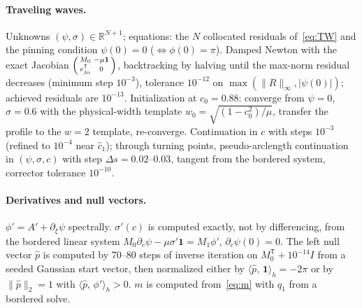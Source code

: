 \documentclass[11pt]{article}
\theoremstyle{plain}
\theoremstyle{definition}
\theoremstyle{remark}
\newcommand{\ip}[2]{\langle #1,\,#2\rangle}
\newcommand{\ph}{\hat p}
\newcommand{\R}{\mathbb{R}}
\newcommand{\one}{\mathbf 1}
\newcommand{\T}{\mathsf T}
\newcommand{\chat}{\hat c_1}
\begin{document}
\paragraph{Traveling waves.} Unknowns $(\psi,\sigma)\in\R^{N+1}$; equations: the $N$
collocated residuals of~\eqref{eq:TW} and the pinning condition $\psi(0)=0$
($\Leftrightarrow\phi(0)=\pi$). Damped Newton with the exact Jacobian
$\begin{psmallmatrix}M_0&-\mu\one\\e_{j_0}^{\T}&0\end{psmallmatrix}$, backtracking by halving
until the max-norm residual decreases (minimum step $10^{-3}$), tolerance $10^{-12}$ on
$\max(\|R\|_\infty,|\psi(0)|)$; achieved residuals are $10^{-13}$. Initialization at
$c_0=0.88$: converge from $\psi=0$, $\sigma=0.6$ with the physical-width template
$w_0=\sqrt{(1-c_0^2)/\mu}$, transfer the profile to the $w=2$ template, re-converge.
Continuation in $c$ with steps $10^{-3}$ (refined to $10^{-4}$ near $\chat$); through turning
points, pseudo-arclength continuation~\cite{Kel77} in $(\psi,\sigma,c)$ with step
$\Delta s=0.02$--$0.03$, tangent from the bordered system, corrector tolerance $10^{-10}$.

\paragraph{Derivatives and null vectors.} $\phi'=A'+\partial_\xi\psi$ spectrally.
$\sigma'(c)$ is computed exactly, not by differencing, from the bordered linear system
$M_0\partial_c\psi-\mu\sigma'\one=M_1\phi'$, $\partial_c\psi(0)=0$. The left null vector $\ph$
is computed by 70--80 steps of inverse iteration on $M_0^{\T}+10^{-14}I$ from a seeded
Gaussian start vector, then normalized either by $\ip{\ph}{\one}_h=-2\pi$ or by
$\|\ph\|_2=1$ with $\ip{\ph}{\phi'}_h>0$. $m$ is computed from~\eqref{eq:m} with $q_1$ from
a bordered solve.
\end{document}
